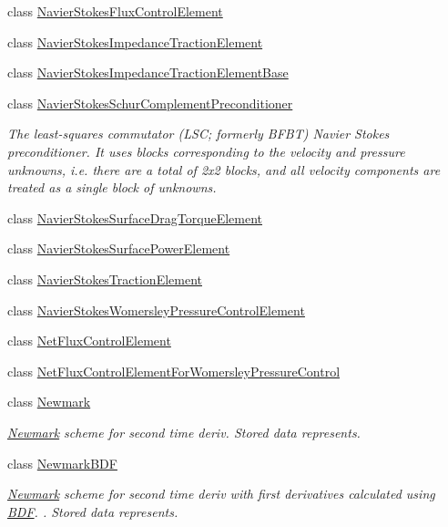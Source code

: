 \begin{DoxyCompactItemize}
class \hyperlink{classoomph_1_1NavierStokesFluxControlElement}{Navier\+Stokes\+Flux\+Control\+Element}
\item 
class \hyperlink{classoomph_1_1NavierStokesImpedanceTractionElement}{Navier\+Stokes\+Impedance\+Traction\+Element}
\item 
class \hyperlink{classoomph_1_1NavierStokesImpedanceTractionElementBase}{Navier\+Stokes\+Impedance\+Traction\+Element\+Base}
\item 
class \hyperlink{classoomph_1_1NavierStokesSchurComplementPreconditioner}{Navier\+Stokes\+Schur\+Complement\+Preconditioner}
\begin{DoxyCompactList}\small\item\em The least-\/squares commutator (L\+SC; formerly B\+F\+BT) Navier Stokes preconditioner. It uses blocks corresponding to the velocity and pressure unknowns, i.\+e. there are a total of 2x2 blocks, and all velocity components are treated as a single block of unknowns. \end{DoxyCompactList}\item 
class \hyperlink{classoomph_1_1NavierStokesSurfaceDragTorqueElement}{Navier\+Stokes\+Surface\+Drag\+Torque\+Element}
\item 
class \hyperlink{classoomph_1_1NavierStokesSurfacePowerElement}{Navier\+Stokes\+Surface\+Power\+Element}
\item 
class \hyperlink{classoomph_1_1NavierStokesTractionElement}{Navier\+Stokes\+Traction\+Element}
\item 
class \hyperlink{classoomph_1_1NavierStokesWomersleyPressureControlElement}{Navier\+Stokes\+Womersley\+Pressure\+Control\+Element}
\item 
class \hyperlink{classoomph_1_1NetFluxControlElement}{Net\+Flux\+Control\+Element}
\item 
class \hyperlink{classoomph_1_1NetFluxControlElementForWomersleyPressureControl}{Net\+Flux\+Control\+Element\+For\+Womersley\+Pressure\+Control}
\item 
class \hyperlink{classoomph_1_1Newmark}{Newmark}
\begin{DoxyCompactList}\small\item\em \hyperlink{classoomph_1_1Newmark}{Newmark} scheme for second time deriv. Stored data represents. \end{DoxyCompactList}\item 
class \hyperlink{classoomph_1_1NewmarkBDF}{Newmark\+B\+DF}
\begin{DoxyCompactList}\small\item\em \hyperlink{classoomph_1_1Newmark}{Newmark} scheme for second time deriv with first derivatives calculated using \hyperlink{classoomph_1_1BDF}{B\+DF}. . Stored data represents. \end{DoxyCompactList}\item 

\end{DoxyCompactItemize}
